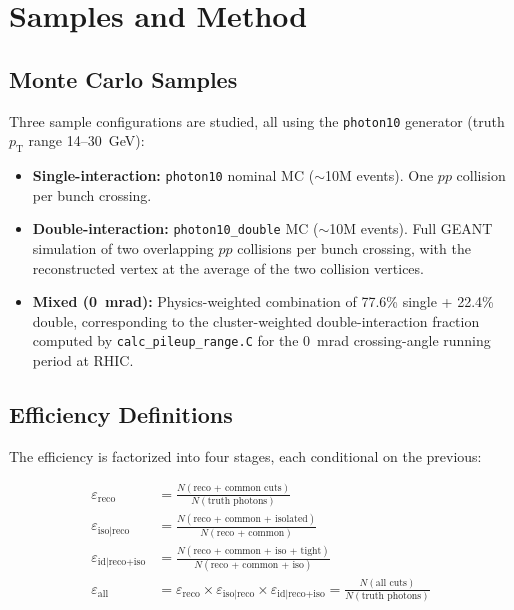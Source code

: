 \documentclass[11pt,letterpaper]{article}
\newcommand{\pT}{\ensuremath{p_{\text{T}}}}
\newcommand{\ereco}{\ensuremath{\varepsilon_{\text{reco}}}}
\newcommand{\eiso}{\ensuremath{\varepsilon_{\text{iso}|\text{reco}}}}
\newcommand{\eid}{\ensuremath{\varepsilon_{\text{id}|\text{reco+iso}}}}
\newcommand{\eall}{\ensuremath{\varepsilon_{\text{all}}}}
\begin{document}
\section{Samples and Method}
\label{sec:method}

\subsection{Monte Carlo Samples}

Three sample configurations are studied, all using the \texttt{photon10}
generator (truth $\pT$ range 14--30~GeV):

\begin{itemize}
  \item \textbf{Single-interaction:} \texttt{photon10} nominal MC
    ($\sim$10M events). One $pp$ collision per bunch crossing.
  \item \textbf{Double-interaction:} \texttt{photon10\_double} MC
    ($\sim$10M events). Full GEANT simulation of two overlapping $pp$
    collisions per bunch crossing, with the reconstructed vertex at the
    average of the two collision vertices.
  \item \textbf{Mixed (0~mrad):} Physics-weighted combination of 77.6\%
    single + 22.4\% double, corresponding to the cluster-weighted
    double-interaction fraction computed by \texttt{calc\_pileup\_range.C}
    for the 0~mrad crossing-angle running period at RHIC.
\end{itemize}

\subsection{Efficiency Definitions}

The efficiency is factorized into four stages, each conditional on the
previous:

\begin{align}
  \ereco &= \frac{N(\text{reco + common cuts})}{N(\text{truth photons})}
    \label{eq:eff_reco} \\[3pt]
  \eiso &= \frac{N(\text{reco + common + isolated})}{N(\text{reco + common})}
    \label{eq:eff_iso} \\[3pt]
  \eid &= \frac{N(\text{reco + common + iso + tight})}{N(\text{reco + common + iso})}
    \label{eq:eff_id} \\[3pt]
  \eall &= \ereco \times \eiso \times \eid
    = \frac{N(\text{all cuts})}{N(\text{truth photons})}
    \label{eq:eff_all}
\end{align}
\end{document}
